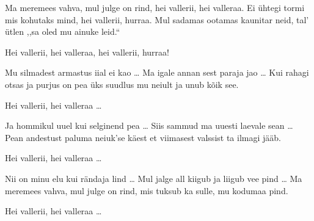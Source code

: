 Ma meremees vahva, mul julge on rind,
hei vallerii, hei valleraa.
Ei \"uhtegi tormi mis kohutaks mind,
hei vallerii, hurraa.
Mul sadamas ootamas kaunitar neid,
tal' \"utlen ,,sa oled mu ainuke leid.{``}

Hei vallerii, hei valleraa,
hei vallerii, hurraa!

Mu silmadest armastus iial ei kao \ldots
Ma igale annan sest paraja jao \ldots
Kui rahagi otsas ja purjus on pea
\"uks suudlus mu neiult ja unub k\~oik see.

Hei vallerii, hei valleraa \ldots

Ja hommikul uuel kui selginend pea \ldots
Siis sammud ma uuesti laevale sean \ldots
Pean andestust paluma neiuk'se k\"aest
et viimasest valssist ta ilmagi j\"a\"ab.

Hei vallerii, hei valleraa \ldots

Nii on minu elu kui r\"andaja lind \ldots
Mul jalge all kiigub ja liigub vee pind \ldots
Ma meremees vahva, mul julge on rind,
mis tuksub ka sulle, mu kodumaa pind.

Hei vallerii, hei valleraa \ldots